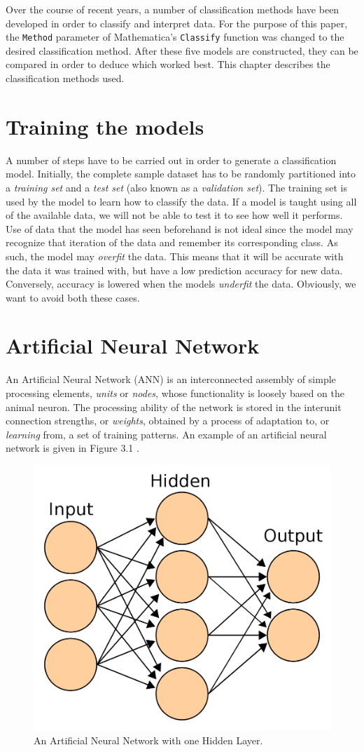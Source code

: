 \documentclass[a4paper, 12pt]{report}
\theoremstyle{definition}
\begin{document}
Over the course of recent years, a number of classification methods have been developed in order to classify and interpret data. For the purpose of this paper, the \texttt{Method} parameter of Mathematica's \texttt{Classify} function was changed to the desired classification method. After these five models are constructed, they can be compared in order to deduce which worked best. This chapter describes the classification methods used.

\section{Training the models}

A number of steps have to be carried out in order to generate a classification model. Initially, the complete sample dataset has to be randomly partitioned into a \textit{training set} and a \textit{test set} (also known as a \textit{validation set}). The training set is used by the model to learn how to classify the data. If a model is taught using all of the available data, we will not be able to test it to see how well it performs. Use of data that the model has seen beforehand is not ideal since the model may recognize that iteration of the data and remember its corresponding class. As such, the model may \textit{overfit} the data. This means that it will be accurate with the data it was trained with, but have a low prediction accuracy for new data. Conversely, accuracy is lowered when the models \textit{underfit} the data. Obviously, we want to avoid both these cases.

\section{Artificial Neural Network}

An Artificial Neural Network (ANN) is an interconnected assembly of simple processing elements, \textit{units} or \textit{nodes}, whose functionality is loosely based on the animal neuron. The processing ability of the network is stored in the interunit connection strengths, or \textit{weights}, obtained by a process of adaptation to, or \textit{learning} from, a set of training patterns. \autocite{gurney_2014} An example of an artificial neural network is given in Figure 3.1 \autocite{NNarchitecture}.

\begin{figure}[h!]
  \centering
  \includegraphics[width=0.5\linewidth]{im/ANN.png}
  \caption{An Artificial Neural Network with one Hidden Layer.}
  \label{fig:ANN1}
\end{figure}
\end{document}
